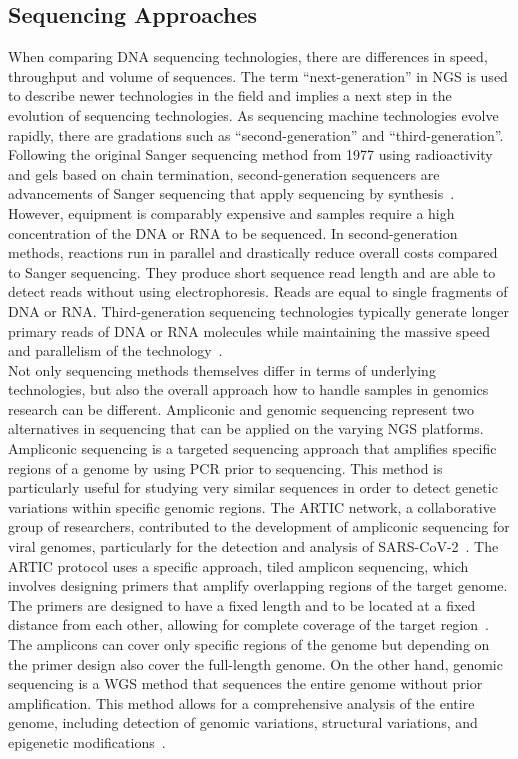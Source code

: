\subsection{Sequencing Approaches}
When comparing \ac{DNA} sequencing technologies, there are differences in speed, throughput and volume of sequences. The term ``next-generation'' in \ac{NGS} is used to describe newer technologies in the field and implies a next step in the evolution of sequencing technologies. As sequencing machine technologies evolve rapidly, there are gradations such as ``second-generation'' and ``third-generation''. Following the original Sanger sequencing method from 1977 using radioactivity and gels based on chain termination, second-generation sequencers are advancements of Sanger sequencing that apply sequencing by synthesis~\cite{mardis2008next}. However, equipment is comparably expensive and samples require a high concentration of the \ac{DNA} or \ac{RNA} to be sequenced. In second-generation methods, reactions run in parallel and drastically reduce overall costs compared to Sanger sequencing. They produce short sequence read length and are able to detect reads without using electrophoresis. Reads are equal to single fragments of \ac{DNA} or \ac{RNA}. Third-generation sequencing technologies typically generate longer primary reads of \ac{DNA} or \ac{RNA} molecules while maintaining the massive speed and parallelism of the technology~\cite{slatko2018overview}. \\
Not only sequencing methods themselves differ in terms of underlying technologies, but also the overall approach how to handle samples in genomics research can be different. Ampliconic and genomic sequencing represent two alternatives in sequencing that can be applied on the varying \ac{NGS} platforms. Ampliconic sequencing is a targeted sequencing approach that amplifies specific regions of a genome by using \ac{PCR} prior to sequencing. This method is particularly useful for studying very similar sequences in order to detect genetic variations within specific genomic regions. The ARTIC network, a collaborative group of researchers, contributed to the development of ampliconic sequencing for viral genomes, particularly for the detection and analysis of \ac{SARS-CoV-2}~\cite{quick2017multiplex, tyson2020improvements}. The ARTIC protocol uses a specific approach, tiled amplicon sequencing, which involves designing primers that amplify overlapping regions of the target genome. The primers are designed to have a fixed length and to be located at a fixed distance from each other, allowing for complete coverage of the target region~\cite{mamanova2010target}. The amplicons can cover only specific regions of the genome but depending on the primer design also cover the full-length genome. On the other hand, genomic sequencing is a \ac{WGS} method that sequences the entire genome without prior amplification. This method allows for a comprehensive analysis of the entire genome, including detection of genomic variations, structural variations, and epigenetic modifications~\cite{quick2017multiplex}.

